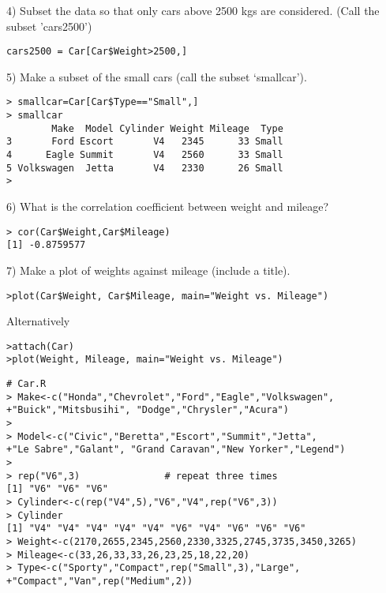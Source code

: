 \documentclass{article}
\begin{document}
4) Subset the data so that only cars above 2500 kgs are considered. (Call the subset 'cars2500')
\begin{verbatim}
cars2500 = Car[Car$Weight>2500,]
\end{verbatim}

5) Make a subset of the small cars (call the subset `smallcar').
\begin{verbatim}
> smallcar=Car[Car$Type=="Small",]
> smallcar
        Make  Model Cylinder Weight Mileage  Type
3       Ford Escort       V4   2345      33 Small
4      Eagle Summit       V4   2560      33 Small
5 Volkswagen  Jetta       V4   2330      26 Small
>
\end{verbatim}

6) What is the correlation coefficient between weight and mileage?

\begin{verbatim}
> cor(Car$Weight,Car$Mileage)
[1] -0.8759577
\end{verbatim}

7) Make a plot of weights against mileage (include a title).

\begin{verbatim}
>plot(Car$Weight, Car$Mileage, main="Weight vs. Mileage")
\end{verbatim}

Alternatively
\begin{verbatim}
>attach(Car)
>plot(Weight, Mileage, main="Weight vs. Mileage")
\end{verbatim}

\newpage


\newpage

\begin{verbatim}
# Car.R
> Make<-c("Honda","Chevrolet","Ford","Eagle","Volkswagen",
+"Buick","Mitsbusihi", "Dodge","Chrysler","Acura")
>
> Model<-c("Civic","Beretta","Escort","Summit","Jetta",
+"Le Sabre","Galant", "Grand Caravan","New Yorker","Legend")
>
> rep("V6",3)               # repeat three times
[1] "V6" "V6" "V6"
> Cylinder<-c(rep("V4",5),"V6","V4",rep("V6",3))
> Cylinder
[1] "V4" "V4" "V4" "V4" "V4" "V6" "V4" "V6" "V6" "V6"
> Weight<-c(2170,2655,2345,2560,2330,3325,2745,3735,3450,3265)
> Mileage<-c(33,26,33,33,26,23,25,18,22,20)
> Type<-c("Sporty","Compact",rep("Small",3),"Large",
+"Compact","Van",rep("Medium",2))
\end{verbatim}
\end{document}
